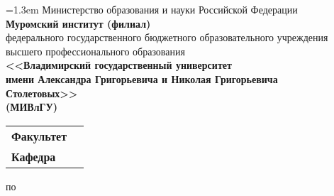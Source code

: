 \newlength{\frontpagefk} %
\setlength{\frontpagefk}{6cm}
\newlength{\frontpagerb} %
\setlength{\frontpagerb}{6cm}
\newlength{\frontpagerbspace} %
\setlength{\frontpagerbspace}{1cm}
\newlength{\FrontPageSubjSpace} %
\setlength{\FrontPageSubjSpace}{1cm}
\newlength{\FrontPageTopicSpace} %
\setlength{\FrontPageTopicSpace}{0.5cm}

\thispagestyle{empty}
\begin{center}
{
\vspace*{-1.5cm}
\baselineskip=1.3em
{\small Министерство образования и науки Российской Федерации}\\
\textbf{Муромский институт (филиал)}\\
{\footnotesize федерального государственного бюджетного образовательного учреждения\\
высшего профессионального образования}\\
\textbf{<<Владимирский государственный университет\\
имени Александра Григорьевича и Николая Григорьевича\\
Столетовых>>\\
(МИВлГУ)\\}
}

\bigskip
\begin{tabular}{l c}
\textbf{Факультет}&\underline{\makebox[\frontpagefk]{\FrontPageDepartment}}\\
\textbf{Кафедра}&\underline{\makebox[\frontpagefk]{\FrontPageSubdepartment}}\\
\end{tabular}

\vspace{\fill}
\begin{Huge}
\textbf{\textsl{\WorkType}}
\end{Huge}

\vspace{\fill}
по \underline{\makebox[\FrontPageSubjSpace]{}\Subject\makebox[\FrontPageSubjSpace]{}}

\smallskip
\parbox{15cm}{}

\vspace{\fill}

\begin{flushright}


\end{flushright}
\end{center}
